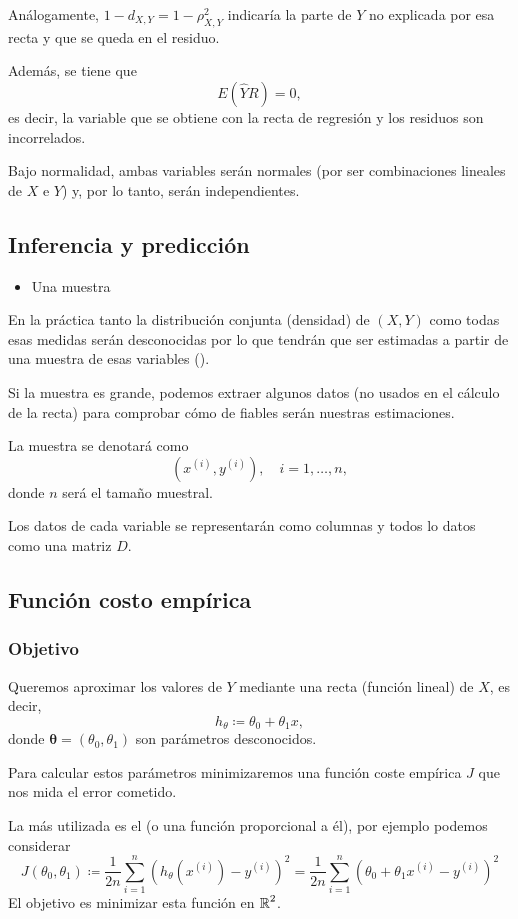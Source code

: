 Análogamente, $1-d_{X,Y}=1-\rho_{X,Y}^2$ indicaría la parte de $Y$ no explicada por esa recta y que se queda en el residuo.

Además, se tiene que \[ E(\hat{Y}R)=0, \] es decir, la variable que se obtiene con la recta de regresión y los residuos son incorrelados.

Bajo normalidad, ambas variables serán normales (por ser combinaciones lineales de $X$ e $Y$) y, por lo tanto, serán independientes.
\subsection{Inferencia y predicción}
\begin{itemize}[label=\color{red}\textbullet, leftmargin=*]
	\item \color{lightblue}Una muestra
\end{itemize}
En la práctica tanto la distribución conjunta (densidad) de $(X,Y)$ como todas esas medidas serán desconocidas por lo que tendrán que ser estimadas a partir de una muestra de esas variables ().

Si la muestra es grande, podemos extraer algunos datos (no usados en el cálculo de la recta) para comprobar cómo de fiables serán nuestras estimaciones.

La muestra se denotará como \[ \left(x^{(i)},y^{(i)}\right),\quad i=1,\dots,n, \]donde $n$ será el tamaño muestral.

Los datos de cada variable se representarán como columnas y todos lo datos como una matriz $D$.
\subsection{Función costo empírica}
\subsubsection{Objetivo}
Queremos aproximar los valores de $Y$ mediante una recta (función lineal) de $X$, es decir, \[ h_\theta\coloneq\theta_0+\theta_1x, \]donde $\mathbf{\theta}=(\theta_0,\theta_1)$ son parámetros desconocidos.

Para calcular estos parámetros minimizaremos una función coste empírica $J$ que nos mida el error cometido.

La más utilizada es el  (o una función proporcional a él), por ejemplo podemos considerar \[ J(\theta_0,\theta_1)\coloneq\dfrac{1}{2n}\sum_{i=1}^{n}\left(h_\theta\left(x^{(i)} \right) - y^{(i)}\right)^2=\dfrac{1}{2n}\sum_{i=1}^{n}\left(\theta_0+\theta_1x^{(i)}-y^{(i)}\right)^2 \]
El objetivo es minimizar esta función en $\operatorname{\mathbb{R}}^2$.
